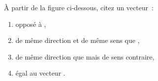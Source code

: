 \exercice À partir de la figure ci-dessous, citez un vecteur~:
\begin{enumerate}
	\item opposé à ,
	\item de même direction et de même sens que ,
	\item de même direction que  mais de sens contraire,
	\item égal au vecteur .
\end{enumerate}

\begin{center}
	
\end{center}